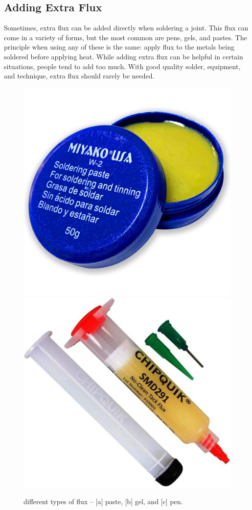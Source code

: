 \subsection{Adding Extra Flux}
Sometimes, extra flux can be added directly when soldering a joint. This flux can come in a variety of forms, but the most common are pens, gels, and pastes. The principle when using any of these is the same: apply flux to the metals being soldered before applying heat. While adding extra flux can be helpful in certain situations, people tend to add too much. With good quality solder, equipment, and technique, extra flux should rarely be needed.
\begin{figure}[h]
    \caption{different types of flux – [a] paste, [b] gel, and [c] pen.}
    \centering
    \includegraphics[scale=0.04]{images/flux_paste.jpg}
    \includegraphics[scale=0.1]{images/flux_gel.jpg}

\end{figure}
